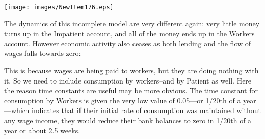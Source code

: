 \begin{center}
  \texttt{[image: images/NewItem176.eps]}
\end{center}

The dynamics of this incomplete model are very different again: very
little money turns up in the Impatient account, and all of the money
ends up in the Workers account. However economic activity also ceases
as both lending and the flow of wages falls towards zero:

\begin{center}
\end{center}

This is because wages are being paid to workers, but they are doing
nothing with it. So we need to include consumption by workers--and by
Patient as well. Here the reason time constants are useful may be more
obvious. The time constant for consumption by Workers is given the
very low value of 0.05---or 1/20th of a year---which indicates that if
their initial rate of consumption was maintained without any wage
income, they would reduce their bank balances to zero in 1/20th of a
year or about 2.5 weeks.
